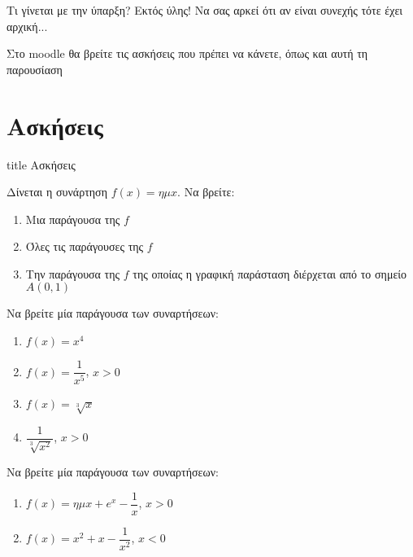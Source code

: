 \documentclass{presentation}
\begin{document}
\begin{frame}{Τι γίνεται με την ύπαρξη?}
    Εκτός ύλης! Να σας αρκεί ότι αν είναι συνεχής τότε έχει αρχική...
    \newline
\end{frame}

\begin{frame}[noframenumbering]
    Στο moodle θα βρείτε τις ασκήσεις που πρέπει να κάνετε, όπως και αυτή τη παρουσίαση
\end{frame}

\section{Ασκήσεις}

\begin{frame}[noframenumbering]
    \vfill
    \centering
    \begin{beamercolorbox}[sep=8pt,center,shadow=true,rounded=true]{title}
        Ασκήσεις
    \end{beamercolorbox}
    \vfill
\end{frame}

\begin{askisi}
    Δίνεται η συνάρτηση $f(x)=ημx$. Να βρείτε:
    \begin{enumerate}[<+->]
        \item Μια παράγουσα της $f$
        \item Όλες τις παράγουσες της $f$
        \item Την παράγουσα της $f$ της οποίας η γραφική παράσταση διέρχεται από το σημείο $A(0,1)$
    \end{enumerate}
\end{askisi}

\begin{askisi}
    Να βρείτε μία παράγουσα των συναρτήσεων:
    \begin{enumerate}[<+->]
        \item $f(x)=x^4$
        \item $f(x)=\dfrac{1}{x^5}$, $x>0$
        \item $f(x)=\sqrt[3]{x}$
        \item $\dfrac{1}{\sqrt[3]{x^2}}$, $x>0$
    \end{enumerate}
\end{askisi}

\begin{askisi}
    Να βρείτε μία παράγουσα των συναρτήσεων:
    \begin{enumerate}[<+->]
        \item $f(x)=ημx+e^x-\dfrac{1}{x}$, $x>0$
        \item $f(x)=x^2+x-\dfrac{1}{x^2}$, $x<0$
    \end{enumerate}
\end{askisi}
\end{document}
